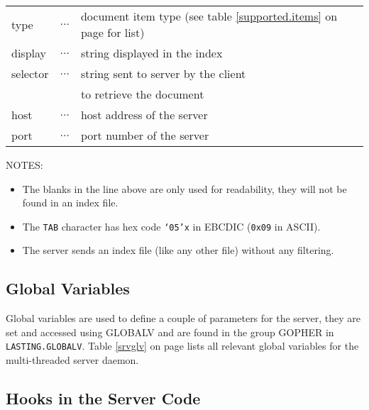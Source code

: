  
\rule{0mm}{3mm}

\noindent
\begin{tabular}{lcl}
type    & $\ldots$ & document item type (see table
                     \ref{supported.items} on page
                     \pageref{supported.items} for list)          \\
display & $\ldots$ & string displayed in the index                \\
selector& $\ldots$ & string sent to server by the client          \\
        &          & to retrieve the document\\
host    & $\ldots$ & host address of the server                   \\
port    & $\ldots$ & port number of the server                    \\
\end{tabular}

\rule{0mm}{3mm}

\noindent NOTES:
\begin{itemize}
\item  The blanks in the line above are only used for readability,
       they will not be found in an index file.
\item  The {\tt TAB} character has hex code {\tt `05'x}
       in EBCDIC ({\tt 0x09} in ASCII).
\item  The server sends an index file (like any other file) without any
       filtering.
\end{itemize}
 


\subsection{Global Variables}
 
  Global variables are used to define a couple of parameters for the
  server, they are set and accessed using GLOBALV and are found in the
  group GOPHER in {\tt LASTING.GLOBALV}.  Table \ref{srvglv} on page
  \pageref{srvglv} lists all relevant global variables for the
  multi-threaded server daemon.



\subsection{Hooks in the Server Code}

